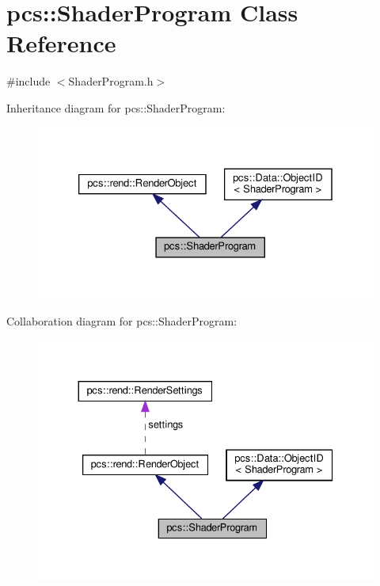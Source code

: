 \hypertarget{classpcs_1_1ShaderProgram}{}\section{pcs\+:\+:Shader\+Program Class Reference}
\label{classpcs_1_1ShaderProgram}


{\ttfamily \#include $<$Shader\+Program.\+h$>$}



Inheritance diagram for pcs\+:\+:Shader\+Program\+:\nopagebreak
\begin{figure}[H]
\begin{center}
\leavevmode
\includegraphics[width=326pt]{classpcs_1_1ShaderProgram__inherit__graph}
\end{center}
\end{figure}


Collaboration diagram for pcs\+:\+:Shader\+Program\+:\nopagebreak
\begin{figure}[H]
\begin{center}
\leavevmode
\includegraphics[width=330pt]{classpcs_1_1ShaderProgram__coll__graph}
\end{center}
\end{figure}
